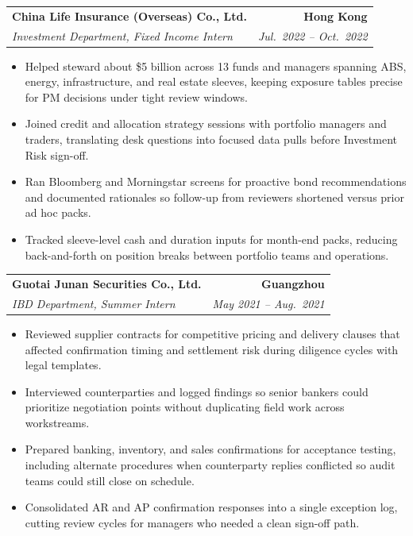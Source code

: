 \documentclass[9pt,a4paper]{extarticle}
\makeatletter
\newcommand{\resumeSubheading}[4]{%
  \vspace{0.6em}%
  \begin{tabular*}{\textwidth}{l@{\extracolsep{\fill}}r}
    \textbf{#1} & \textbf{#2} \\
    \textit{\small #3} & \textit{\small #4} \\
  \end{tabular*}\vspace{0.32em}}
\makeatother
\begin{document}
\resumeSubheading{China Life Insurance (Overseas) Co., Ltd.}{Hong Kong}{Investment Department, Fixed Income Intern}{Jul.\ 2022 -- Oct.\ 2022}
\begin{itemize}
  \item Helped steward about \$5 billion across 13 funds and managers spanning ABS, energy, infrastructure, and real estate sleeves, keeping exposure tables precise for PM decisions under tight review windows.
  \item Joined credit and allocation strategy sessions with portfolio managers and traders, translating desk questions into focused data pulls before Investment Risk sign-off.
  \item Ran Bloomberg and Morningstar screens for proactive bond recommendations and documented rationales so follow-up from reviewers shortened versus prior ad hoc packs.
  \item Tracked sleeve-level cash and duration inputs for month-end packs, reducing back-and-forth on position breaks between portfolio teams and operations.
\end{itemize}

\resumeSubheading{Guotai Junan Securities Co., Ltd.}{Guangzhou}{IBD Department, Summer Intern}{May 2021 -- Aug.\ 2021}
\begin{itemize}
  \item Reviewed supplier contracts for competitive pricing and delivery clauses that affected confirmation timing and settlement risk during diligence cycles with legal templates.
  \item Interviewed counterparties and logged findings so senior bankers could prioritize negotiation points without duplicating field work across workstreams.
  \item Prepared banking, inventory, and sales confirmations for acceptance testing, including alternate procedures when counterparty replies conflicted so audit teams could still close on schedule.
  \item Consolidated AR and AP confirmation responses into a single exception log, cutting review cycles for managers who needed a clean sign-off path.
\end{itemize}
\end{document}
